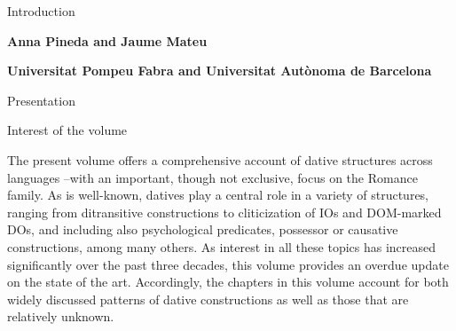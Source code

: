 
\clearpage\setcounter{page}{1}\begin{styleTitleA}
Introduction
\end{styleTitleA}

\begin{styleBodyA}\sffamily\bfseries
Anna Pineda and Jaume Mateu
\end{styleBodyA}

\begin{styleBodyA}\sffamily\bfseries
Universitat Pompeu Fabra and Universitat Autònoma de Barcelona
\end{styleBodyA}


\setcounter{listWWviiiNumiileveli}{0}
\begin{listWWviiiNumiileveli}
\item 
\begin{stylelsSectioni}
Presentation\newline

\end{stylelsSectioni}


\setcounter{listWWviiiNumiilevelii}{0}
\begin{listWWviiiNumiilevelii}
\item 
\begin{stylelsSectionii}
Interest of the volume
\end{stylelsSectionii}
\end{listWWviiiNumiilevelii}
\end{listWWviiiNumiileveli}
\begin{styleBodyA}
The present volume offers a comprehensive account of dative structures across languages –with an important, though not exclusive, focus on the Romance family. As is well-known, datives play a central role in a variety of structures, ranging from ditransitive constructions to cliticization of IOs and DOM-marked DOs, and including also psychological predicates, possessor or causative constructions, among many others. As interest in all these topics has increased significantly over the past three decades, this volume provides an overdue update on the state of the art. Accordingly, the chapters in this volume account for both widely discussed patterns of dative constructions as well as those that are relatively unknown. 
\end{styleBodyA}

